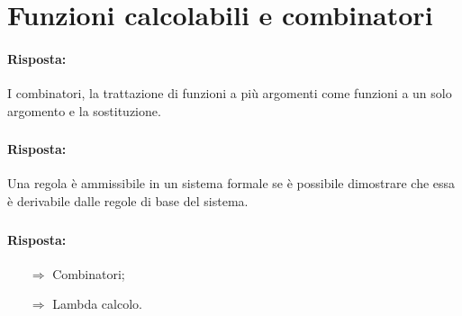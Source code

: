 \section{Funzioni calcolabili e combinatori}


\paragraph{Risposta:} I combinatori, la trattazione di funzioni a più argomenti
come funzioni a un solo argomento e la sostituzione.

\subsubsection{}


\paragraph{Risposta:} Una regola è ammissibile in un sistema formale se è possibile
dimostrare che essa è derivabile dalle regole di base del sistema.

\subsubsection{}


\paragraph{Risposta:}

\begin{itemize}
    \item [$\Rightarrow$] Combinatori;
    \item [$\Rightarrow$] Lambda calcolo.
\end{itemize}

\subsubsection{}


